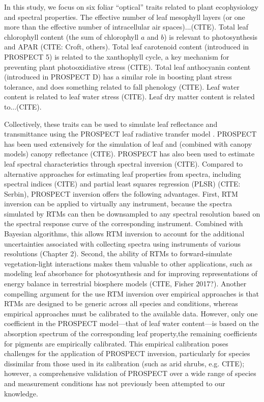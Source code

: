 In this study, we focus on six foliar ``optical'' traits related to plant ecophysiology and spectral properties.
The effective number of leaf mesophyll layers (or one more than the effective number of intracellular air spaces)...(CITE).
Total leaf chlorophyll content (the sum of chlorophyll $a$ and $b$) is relevant to photosynthesis and APAR (CITE: Croft, others).
Total leaf carotenoid content (introduced in PROSPECT 5) is related to the xanthophyll cycle, a key mechanism for preventing plant photooxidiative stress (CITE).
Total leaf anthocyanin content (introduced in PROSPECT D) has a similar role in boosting plant stress tolerance, and does something related to fall phenology (CITE).
Leaf water content is related to leaf water stress (CITE).
Leaf dry matter content is related to...(CITE).

Collectively, these traits can be used to simulate leaf reflectance and transmittance using the PROSPECT leaf radiative transfer model \cite{jacquemoud1990_prospect,feret2008_prospect,feret2017_prospectd}.
PROSPECT has been used extensively for the simulation of leaf and (combined with canopy models) canopy reflectance (CITE).
PROSPECT has also been used to estimate leaf spectral characteristics through spectral inversion (CITE).
Compared to alternative approaches for estimating leaf properties from spectra, including spectral indices (CITE) and partial least squares regression (PLSR) \cite{barnes_2017_beyond} (CITE: Serbin), PROSPECT inversion offers the following advantages.
First, RTM inversion can be applied to virtually any instrument, because the spectra simulated by RTMs can then be downsampled to any spectral resolution based on the spectral response curve of the corresponding instrument.
Combined with Bayesian algorithms, this allows RTM inversion to account for the additional uncertainties associated with collecting spectra using instruments of various resolutions (Chapter 2).
Second, the ability of RTMs to forward-simulate vegetation-light interactions makes them valuable to other applications, such as modeling leaf absorbance for photosynthesis and for improving representations of energy balance in terrestrial biosphere models (CITE, Fisher 2017?).
Another compelling argument for the use RTM inversion over empirical approaches is that RTMs are designed to be generic across all species and conditions, whereas empirical approaches must be calibrated to the available data.
However, only one coefficient in the PROSPECT model---that of leaf water content---is based on the absorption spectrum of the corresponding leaf property,the remaining coefficients for pigments are empirically calibrated.
This empirical calibration poses challenges for the application of PROSPECT inversion, particularly for species dissimilar from those used in its calibration (such as arid shrubs, e.g. CITE); however, a comprehensive validation of PROSPECT over a wide range of species and measurement conditions has not previously been attempted to our knowledge.

